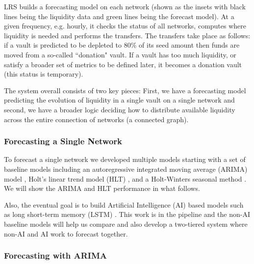 LRS builds a forecasting model on each network (shown as the insets with black lines being the liquidity data and green lines being the forecast model). At a given frequency, e.g. hourly, it checks the status of all networks, computes where liquidity is needed and performs the transfers.
%
The transfers take place as follows: if a vault is predicted to be depleted to 80\% of its seed amount then funds are moved from a so-called ``donation" vault. If a vault has too much liquidity, or satisfy a broader set of metrics to be defined later, it becomes a donation vault (this status is temporary).

The system overall consists of two key pieces: First, we have a forecasting model predicting the evolution of liquidity in a single vault on a single network and second, we have a broader logic deciding how to distribute available liquidity across the entire connection of networks (a connected graph).

\subsubsection{Forecasting a Single Network}

To forecast a single network we developed multiple models starting with a set of baseline models including an autoregressive integrated moving average (ARIMA) model \cite{AnScience}, Holt's linear trend model (HLT) \cite{7.2Ed}, and a Holt-Winters seasonal method \cite{7.3Ed}. We will show the ARIMA and HLT performance in what follows.

Also, the eventual goal is to build Artificial Intelligence (AI) \cite{ArtificialBritannica} based models such as long short-term memory (LSTM) \cite{UnderstandingBlog}.
%
This work is in the pipeline and the non-AI baseline models will help us compare and also develop a two-tiered system where non-AI and AI work to forecast together.

\subsubsection*{Forecasting with ARIMA}

